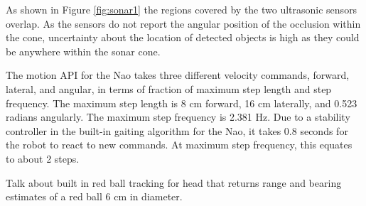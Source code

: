 As shown in Figure \ref{fig:sonar1} the regions covered by the two ultrasonic sensors overlap. As the sensors do not report the angular position of the occlusion within the cone, uncertainty about the location of detected objects is high as they could be anywhere within the sonar cone.

The motion API for the Nao takes three different velocity commands, forward, lateral, and angular, in terms of fraction of maximum step length and step frequency. The maximum step length is 8 cm forward, 16 cm laterally, and 0.523 radians angularly. The maximum step frequency is 2.381 Hz. Due to a stability controller in the built-in gaiting algorithm for the Nao, it takes 0.8 seconds for the robot to react to new commands. At maximum step frequency, this equates to about 2 steps. \cite{naodoc_motion1}

Talk about built in red ball tracking for head that returns range and bearing estimates of a red ball 6 cm in diameter.

